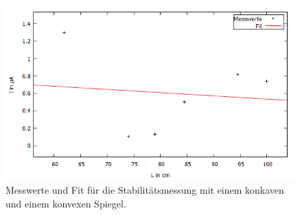 \begin{figure}[H]
  \centering
  \includegraphics[width=14cm]{bilder/konkavplanar.png}
  \caption{Messwerte und Fit für die Stabilitätsmessung mit einem konkaven und einem konvexen Spiegel.}
  \label{dumm}
\end{figure}
